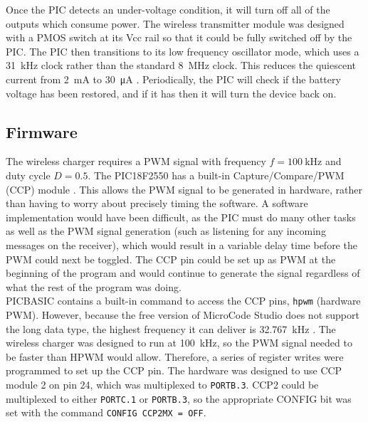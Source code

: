 Once the PIC detects an under-voltage condition, it will turn off all of the outputs which consume power. The wireless transmitter module was designed with a PMOS switch at its Vcc rail so that it could be fully switched off by the PIC. The PIC then transitions to its low frequency oscillator mode, which uses a \SI{31}{\kilo\hertz} clock rather than the standard \SI{8}{\mega\hertz} clock. This reduces the quiescent current from \SI{2}{\milli\ampere} to \SI{30}{\micro\ampere} \cite{pic16f688}. Periodically, the PIC will check if the battery voltage has been restored, and if it has then it will turn the device back on.\\





\subsection{Firmware}
The wireless charger requires a PWM signal with frequency $f=\SI{100}{\kilo\hertz}$ and duty cycle $D=0.5$. The PIC18F2550 has a built-in Capture/Compare/PWM (CCP) module \cite{pic18f2550}. This allows the PWM signal to be generated in hardware, rather than having to worry about precisely timing the software. A software implementation would have been difficult, as the PIC must do many other tasks as well as the PWM signal generation (such as listening for any incoming messages on the receiver), which would result in a variable delay time before the PWM could next be toggled. The CCP pin could be set up as PWM at the beginning of the program and would continue to generate the signal regardless of what the rest of the program was doing.\\

PICBASIC contains a built-in command to access the CCP pins, \verb|hpwm| (hardware PWM). However, because the free version of MicroCode Studio does not support the long data type, the highest frequency it can deliver is \SI{32.767}{\kilo\hertz} \cite{picbasic_pro}. The wireless charger was designed to run at \SI{100}{\kilo\hertz}, so the PWM signal needed to be faster than HPWM would allow. Therefore, a series of register writes were programmed to set up the CCP pin. The hardware was designed to use CCP module 2 on pin 24, which was multiplexed to \verb|PORTB.3|. CCP2 could be multiplexed to either \verb|PORTC.1| or \verb|PORTB.3|, so the appropriate CONFIG bit was set with the command \verb|CONFIG CCP2MX = OFF|.\\

